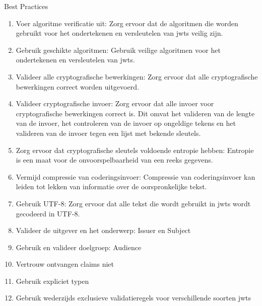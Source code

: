   Best Practices
  \begin{enumerate}[label=\textbf{-}]
    \item Voer algoritme verificatie uit: Zorg ervoor dat de algoritmen die worden gebruikt voor het ondertekenen en versleutelen van \gls{jwts} veilig zijn.
    \item Gebruik geschikte algoritmen: Gebruik veilige algoritmen voor het ondertekenen en versleutelen van \gls{jwts}.
    \item Valideer alle cryptografische bewerkingen: Zorg ervoor dat alle cryptografische bewerkingen correct worden uitgevoerd.
    \item Valideer cryptografische invoer: Zorg ervoor dat alle invoer voor cryptografische bewerkingen correct is. Dit omvat het valideren van de lengte van de invoer, het controleren van de invoer op ongeldige tekens en het valideren van de invoer tegen een lijst met bekende sleutels.
    \item Zorg ervoor dat cryptografische sleutels voldoende entropie hebben: Entropie is een maat voor de onvoorspelbaarheid van een reeks gegevens.
    \item Vermijd compressie van coderingsinvoer: Compressie van coderingsinvoer kan leiden tot lekken van informatie over de oorspronkelijke tekst.
    \item Gebruik UTF-8: Zorg ervoor dat alle tekst die wordt gebruikt in \gls{jwts} wordt gecodeerd in UTF-8.
    \item Valideer de uitgever en het onderwerp: Issuer en Subject
    \item Gebruik en valideer doelgroep: Audience
    \item Vertrouw ontvangen claims niet
    \item Gebruik expliciet typen
    \item Gebruik wederzijds exclusieve validatieregels voor verschillende soorten \gls{jwts}
  \end{enumerate}
  \autocite{Sheffer2020}


